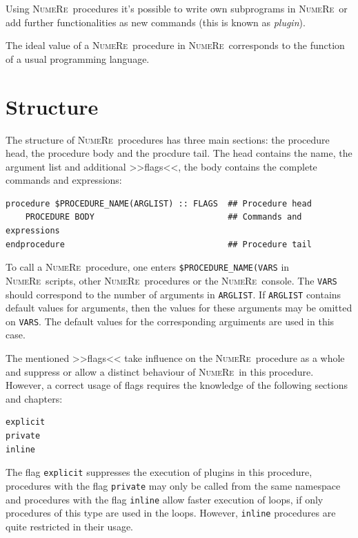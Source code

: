\documentclass[DIV=14,headsepline,footsepline]{scrbook}
\newcommand{\NR}{\textsc{Nu\-me\-Re}}
\begin{document}
				Using \NR\ procedures it's possible to write own subprograms in \NR\ or add further functionalities as new commands (this is known as \emph{plugin}).
				
				The ideal value of a \NR\ procedure in \NR\ corresponds to the function of a usual programming language.
								
			\section{Structure}
				The structure of \NR\ procedures has three main sections: the procedure head, the procedure body and the procdure tail. The head contains the name, the argument list and additional >>flags<<, the body contains the complete commands and expressions:
				\begin{lstlisting}
procedure $PROCEDURE_NAME(ARGLIST) :: FLAGS  ## Procedure head
	PROCEDURE BODY                           ## Commands and expressions
endprocedure                                 ## Procedure tail
				\end{lstlisting}
				To call a \NR\ procedure, one enters \verb+$PROCEDURE_NAME(VARS+ in \NR\ scripts, other \NR\ procedures or the \NR\ console. The \verb+VARS+ should correspond to the number of arguments in \verb+ARGLIST+. If \verb+ARGLIST+ contains default values for arguments, then the values for these arguments may be omitted on \verb+VARS+. The default values for the corresponding arguiments are used in this case.
				
				The mentioned >>flags<< take influence on the \NR\ procedure as a whole and suppress or allow a distinct behaviour of \NR\ in this procedure. However, a correct usage of flags requires the knowledge of the following sections and chapters:
				\begin{lstlisting}
explicit
private
inline
				\end{lstlisting}
				The flag \verb+explicit+ suppresses the execution of plugins in this procedure, procedures with the flag \verb+private+ may only be called from the same namespace and procedures with the flag \verb+inline+ allow faster execution of loops, if only procedures of this type are used in the loops. However, \verb+inline+ procedures are quite restricted in their usage.
				
\end{document}
